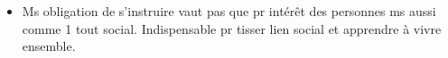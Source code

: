 \documentclass[12pt]{article}
\begin{document}
\begin{itemize}
\item Ms obligation de s'instruire vaut pas que pr intérêt des personnes ms aussi comme 1 tout social.  Indispensable pr tisser lien social et apprendre à vivre ensemble.



























\end{itemize}
\end{document}
